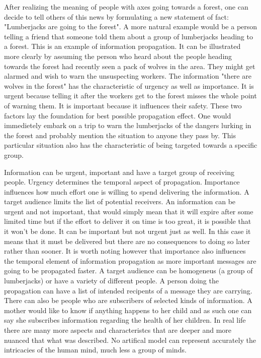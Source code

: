 After realizing the meaning of people with axes going towards a forest, one can decide to tell others of this news by formulating a new statement of fact: "Lumberjacks are going to the forest".
A more natural example would be a person telling a friend that someone told them about a group of lumberjacks heading to a forest.
This is an example of information propagation.
It can be illustrated more clearly by assuming the person who heard about the people heading towards the forest had recently seen a pack of wolves in the area.
They might get alarmed and wish to warn the unsuspecting workers.
The information "there are wolves in the forest" has the characteristic of urgency as well as importance.
It is urgent because telling it after the workers get to the forest misses the whole point of warning them.
It is important because it influences their safety.
These two factors lay the foundation for best possible propagation effect.
One would immedietely embark on a trip to warn the lumberjacks of the dangers lurking in the forest and probably mention the situation to anyone they pass by.
This particular situation also has the characteristic of being targeted towards a specific group.

Information can be urgent, important and have a target group of receiving people.
Urgency determines the temporal aspect of propagation.
Importance influences how much effort one is willing to spend delivering the information.
A target audience limits the list of potential receivers.
An information can be urgent and not important, that would simply mean that it will expire after some limited time but if the effort to deliver it on time is too great, it is possible that it won't be done.
It can be important but not urgent just as well.
In this case it means that it must be delivered but there are no consequences to doing so later rather than sooner.
It is worth noting however that importance also influences the temporal element of information propagation as more important messages are going to be propagated faster.
A target audience can be homogeneus (a group of lumberjacks) or have a variety of different people.
A person doing the propagation can have a list of intended recipents of a message they are carrying.
There can also be people who are subscribers of selected kinds of information.
A mother would like to know if anything happens to her child and as such one can say she subscribes information regarding the health of her children.
In real life there are many more aspects and characteristcs that are deeper and more nuanced that what was described.
No artifical model can represent accurately the intricacies of the human mind, much less a group of minds.

